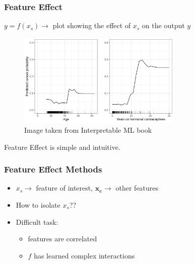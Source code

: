 \documentclass{beamer}
\begin{document}
\begin{frame}
  \frametitle{Feature Effect}
  \(y = f(x_s) \rightarrow\) plot showing the effect of \(x_s\) on the output \(y\)
  \vspace{2mm}
  \begin{figure}[ht]
    \centering
    \includegraphics[width=0.7\textwidth]{./figures/pdp-cervical-1.jpeg}
    \caption{Image taken from Interpretable ML book~\citep{molnar2022}}
  \end{figure}

  \noindent\makebox[\linewidth]{\rule{\paperwidth}{0.4pt}}
  Feature Effect is simple and intuitive.
\end{frame}

\begin{frame}
  \frametitle{Feature Effect Methods}
  \begin{itemize}
  \item \(x_s \rightarrow \) feature of interest, \(\bm{x_c} \rightarrow\) other features
  \item How to isolate \(x_s\)??
  \item Difficult task:
    \begin{itemize}
    \item features are correlated
      \item \(f\) has learned complex interactions
    \end{itemize}
  \end{itemize}
\end{frame}
\end{document}
